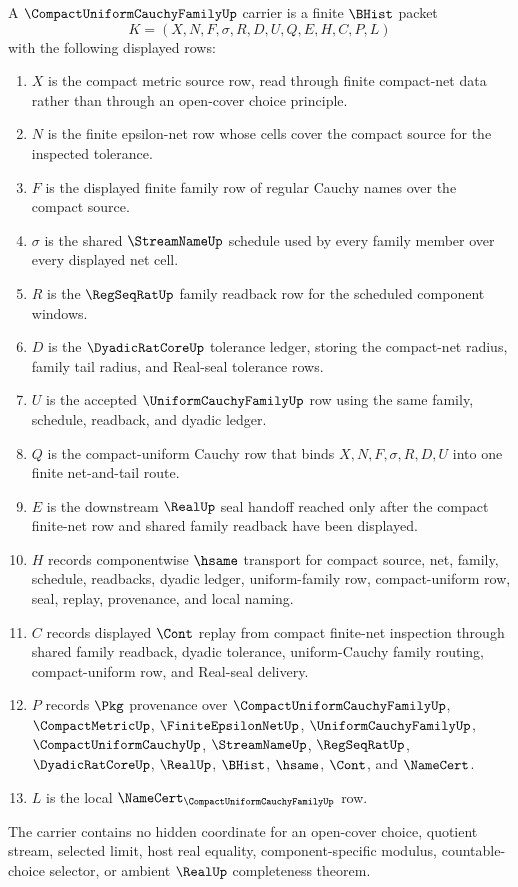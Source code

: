 \begin{definition}
\label{def:compact-uniform-cauchy-family-carrier}
A $\CompactUniformCauchyFamilyUp$ carrier is a finite $\BHist$ packet
$$
K=(X,N,F,\sigma,R,D,U,Q,E,H,C,P,L)
$$
with the following displayed rows:
\begin{enumerate}
\item $X$ is the compact metric source row, read through finite compact-net data rather than through an open-cover choice principle.
\item $N$ is the finite epsilon-net row whose cells cover the compact source for the inspected tolerance.
\item $F$ is the displayed finite family row of regular Cauchy names over the compact source.
\item $\sigma$ is the shared $\StreamNameUp$ schedule used by every family member over every displayed net cell.
\item $R$ is the $\RegSeqRatUp$ family readback row for the scheduled component windows.
\item $D$ is the $\DyadicRatCoreUp$ tolerance ledger, storing the compact-net radius, family tail radius, and Real-seal tolerance rows.
\item $U$ is the accepted $\UniformCauchyFamilyUp$ row using the same family, schedule, readback, and dyadic ledger.
\item $Q$ is the compact-uniform Cauchy row that binds $X,N,F,\sigma,R,D,U$ into one finite net-and-tail route.
\item $E$ is the downstream $\RealUp$ seal handoff reached only after the compact finite-net row and shared family readback have been displayed.
\item $H$ records componentwise $\hsame$ transport for compact source, net, family, schedule, readbacks, dyadic ledger, uniform-family row, compact-uniform row, seal, replay, provenance, and local naming.
\item $C$ records displayed $\Cont$ replay from compact finite-net inspection through shared family readback, dyadic tolerance, uniform-Cauchy family routing, compact-uniform row, and Real-seal delivery.
\item $P$ records $\Pkg$ provenance over $\CompactUniformCauchyFamilyUp$, $\CompactMetricUp$, $\FiniteEpsilonNetUp$, $\UniformCauchyFamilyUp$, $\CompactUniformCauchyUp$, $\StreamNameUp$, $\RegSeqRatUp$, $\DyadicRatCoreUp$, $\RealUp$, $\BHist$, $\hsame$, $\Cont$, and $\NameCert$.
\item $L$ is the local $\NameCert_{\CompactUniformCauchyFamilyUp}$ row.
\end{enumerate}
The carrier contains no hidden coordinate for an open-cover choice, quotient stream, selected limit, host real equality, component-specific modulus, countable-choice selector, or ambient $\RealUp$ completeness theorem.
\end{definition}

